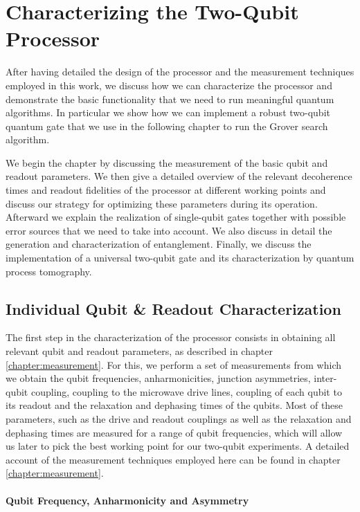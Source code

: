 \chapter{Characterizing the Two-Qubit Processor} \label{chapter:processor_characterization}

After having detailed the design of the processor and the measurement techniques employed in this work, we discuss how we can characterize the processor and demonstrate the basic functionality that we need to run meaningful quantum algorithms. In particular we show how we can implement a robust two-qubit quantum gate that we use in the following chapter to run the Grover search algorithm.

\smallskip

We begin the chapter by discussing the measurement of the basic qubit and readout parameters. We then give a detailed overview of the relevant decoherence times and readout fidelities of the processor at different working points and discuss our strategy for optimizing these parameters during its operation. Afterward we explain the realization of single-qubit gates together with possible error sources that we need to take into account. We also discuss in detail the generation and characterization of entanglement. Finally, we discuss the implementation of a universal two-qubit gate and its characterization by quantum process tomography.

\section{Individual Qubit \& Readout Characterization}

The first step in the characterization of the processor consists in obtaining all relevant qubit and readout parameters, as described in chapter \ref{chapter:measurement}. For this, we perform a set of measurements from which we obtain the qubit frequencies, anharmonicities, junction asymmetries, inter-qubit coupling, coupling to the microwave drive lines, coupling of each qubit to its readout and the relaxation and dephasing times of the qubits. Most of these parameters, such as the drive and readout couplings as well as the relaxation and dephasing times are measured for a range of qubit frequencies, which will allow us later to pick the best working point for our two-qubit experiments. A detailed account of the measurement techniques employed here can be found in chapter \ref{chapter:measurement}. 

\subsubsection{Qubit Frequency, Anharmonicity and Asymmetry}

